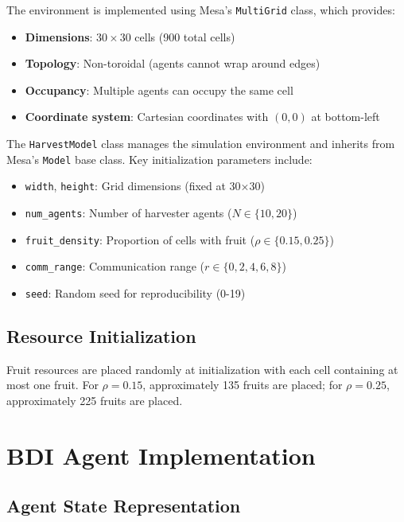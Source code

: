 The environment is implemented using Mesa's \texttt{MultiGrid} class, which provides:

\begin{itemize}
    \item \textbf{Dimensions}: $30 \times 30$ cells (900 total cells)
    \item \textbf{Topology}: Non-toroidal (agents cannot wrap around edges)
    \item \textbf{Occupancy}: Multiple agents can occupy the same cell
    \item \textbf{Coordinate system}: Cartesian coordinates with $(0,0)$ at bottom-left
\end{itemize}

The \texttt{HarvestModel} class manages the simulation environment and inherits from Mesa's \texttt{Model} base class. Key initialization parameters include:

\begin{itemize}
    \item \texttt{width}, \texttt{height}: Grid dimensions (fixed at 30×30)
    \item \texttt{num\_agents}: Number of harvester agents ($N \in \{10, 20\}$)
    \item \texttt{fruit\_density}: Proportion of cells with fruit ($\rho \in \{0.15, 0.25\}$)
    \item \texttt{comm\_range}: Communication range ($r \in \{0, 2, 4, 6, 8\}$)
    \item \texttt{seed}: Random seed for reproducibility (0-19)
\end{itemize}

\subsection{Resource Initialization}

Fruit resources are placed randomly at initialization with each cell containing at most one fruit. For $\rho = 0.15$, approximately 135 fruits are placed; for $\rho = 0.25$, approximately 225 fruits are placed.

\section{BDI Agent Implementation}

\subsection{Agent State Representation}

